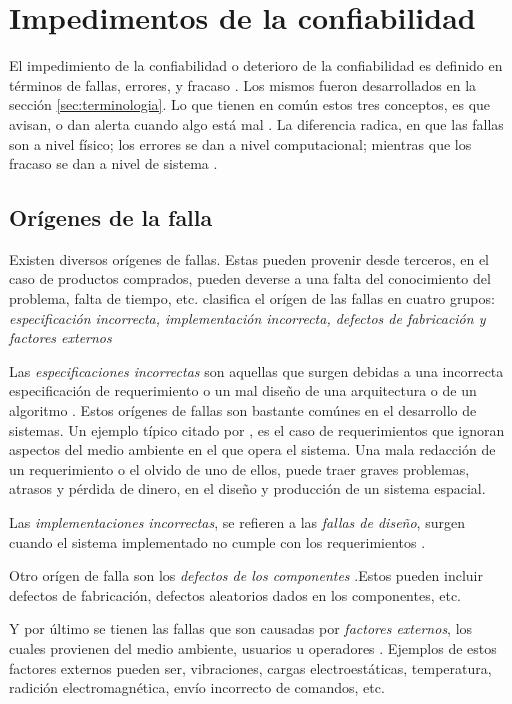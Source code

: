 \section{Impedimentos de la confiabilidad}\label{sec:impedimentos}
El impedimiento de la confiabilidad o deterioro de la confiabilidad es definido en términos de
fallas, errores, y fracaso \citep{FTDesign}. Los mismos fueron desarrollados en la sección
\ref{sec:terminologia}. Lo que tienen en común estos tres conceptos, es que avisan, o dan alerta
cuando algo está mal \citep{FTDesign}. La diferencia radica, en que las fallas son a nivel físico;
los errores se dan a nivel computacional; mientras que los fracaso se dan a nivel de sistema
\cite{FTDesign}.

\subsection{Orígenes de la falla}
Existen diversos orígenes de fallas. Estas pueden provenir desde terceros, en el caso de productos
comprados, pueden deverse a una falta del conocimiento del problema, falta de tiempo, etc.
\cite{FTDesign} clasifica el orígen de las fallas en cuatro grupos: \textit{especificación
incorrecta, implementación incorrecta, defectos de fabricación y factores externos}

Las \textit{especificaciones incorrectas} son aquellas que surgen debidas a una incorrecta
especificación de requerimiento o un mal diseño de una arquitectura o de un algoritmo
\citep{FTDesign}. Estos orígenes de fallas son bastante comúnes en el desarrollo de sistemas. Un
ejemplo típico citado por \cite{FTDesign}, es el caso de requerimientos que ignoran aspectos del
medio ambiente en el que opera el sistema. Una mala redacción de un requerimiento o el olvido de
uno de ellos, puede traer graves problemas, atrasos y pérdida de dinero,  en el diseño y producción
de un sistema espacial.

Las \textit{implementaciones incorrectas}, se refieren a las \textit{fallas de diseño}, surgen
cuando el sistema implementado no cumple con los requerimientos \citep{FTDesign}.

Otro orígen de falla son los \textit{defectos de los componentes} \citep{FTDesign}.Estos pueden
incluir defectos de fabricación, defectos aleatorios dados en los componentes, etc.

Y por último se tienen las fallas que son causadas por \textit{factores externos}, los cuales
provienen del medio ambiente, usuarios u operadores \citep{FTDesign}. Ejemplos de estos factores
externos pueden ser, vibraciones, cargas electroestáticas, temperatura, radición electromagnética,
envío incorrecto de comandos, etc.

